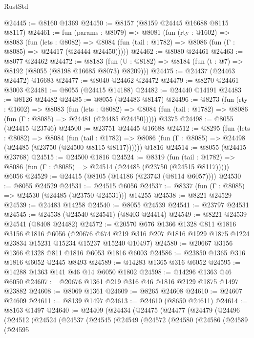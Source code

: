 \begin{lexlean}{RustStd}
\begin{coremodule}
@24445 := @8160 @1369
@24450 := @8157 (@8159 @24445 @16688 @8115 @8117)
@24461 := fun (params : @8079) =>
  @8081
    (fun (rty : @1602) =>
    @8083
      (fun (lets : @8082) =>
      @8084 (fun (tail : @1782) => @8086 (fun (Γ : @8085) => @24417 (@24444 @24450)))))
@24462 := @8080 @24461
@24463 := @8077 @24462
@24472 := @8183
    (fun (U : @8182) => @8184 (fun (t : @7) => @8192 (@8055 (@8198 @16685 @8073) @8209)))
@24475 := @24437 (@24463 @24472) @16683
@24477 := @8040 @24462 @24472
@24479 := @8270 @24461 @3003
@24481 := @8055 (@24415 @14188)
@24482 := @24440 @14191
@24483 := @8126 @24482
@24485 := @8055 (@24483 @8147)
@24496 := @8273
    (fun (rty : @1602) =>
    @8083
      (fun (lets : @8082) =>
      @8084 (fun (tail : @1782) => @8086 (fun (Γ : @8085) => @24481 (@24485 @24450)))))
    @3375
@24498 := @8055 (@24415 @23746)
@24500 := @23751 @24445 @16688
@24512 := @8295
    (fun (lets : @8082) =>
    @8084
      (fun (tail : @1782) =>
      @8086 (fun (Γ : @8085) => @24498 (@24485 (@23750 (@24500 @8115 @8117))))))
    @1816
@24514 := @8055 (@24415 @23768)
@24515 := @24500 @1816
@24524 := @8319
    (fun (tail : @1782) => @8086 (fun (Γ : @8085) => @24514 (@24485 (@23750 (@24515 @8117)))))
    @6056
@24529 := @24415 (@8105 (@14186 (@23743 (@8114 @6057))))
@24530 := @8055 @24529
@24531 := @24515 @6056
@24537 := @8337 (fun (Γ : @8085) => @24530 (@24485 (@23750 @24531))) @14255
@24538 := @8221 @24529
@24539 := @24483 @14258
@24540 := @8055 @24539
@24541 := @23797 @24531
@24545 := @24538 (@24540 @24541) (@8403 @24414)
@24549 := @8221 @24539 @24541 (@8408 @24482)
@24572 := @20570
    @676
    @1366
    @1328
    @811
    @1816
    @3156
    @1816
    @6056
    (@20676 @674 @219 @316 @207 @1816 @1929 @1875 @1224 @23834 @15231 @15234 @15237 @15240 @10497)
@24580 := @20667 @3156 @1366 @1328 @811 @1816 @6053 @1816 @6003
@24586 := @23850 @1365 @316 @1816 @6052 @2445 @8493
@24589 := @14283 @1365 @316 @6052
@24595 := @14288 @1363 @141 @46 @14 @6050 @1802
@24598 := @14296 @1363 @46 @6050
@24607 := @20676 @1361 @219 @316 @46 @1816 @2129 @1875 @1497 @23882
@24608 := @8069 @1361
@24609 := @8265 @24608
@24610 := @24607 @24609
@24611 := @8139 @1497
@24613 := @24610 (@8650 @24611)
@24614 := @8163 @1497
@24640 := @24409
    (@24434
      (@24475
        (@24477
          (@24479
            (@24496
              (@24512
                (@24524
                  (@24537
                    (@24545
                      (@24549
                        (@24572
                          (@24580
                            (@24586
                              (@24589
                                (@24595

\end{coremodule}
\end{lexlean}
